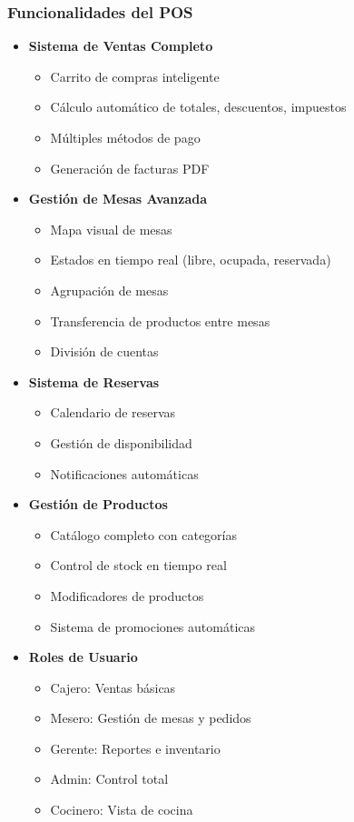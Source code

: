 \documentclass[12pt,a4paper]{article}
\begin{document}
\subsubsection{Funcionalidades del POS}
\begin{itemize}
    \item \textbf{Sistema de Ventas Completo}
    \begin{itemize}
        \item Carrito de compras inteligente
        \item Cálculo automático de totales, descuentos, impuestos
        \item Múltiples métodos de pago
        \item Generación de facturas PDF
    \end{itemize}
    
    \item \textbf{Gestión de Mesas Avanzada}
    \begin{itemize}
        \item Mapa visual de mesas
        \item Estados en tiempo real (libre, ocupada, reservada)
        \item Agrupación de mesas
        \item Transferencia de productos entre mesas
        \item División de cuentas
    \end{itemize}
    
    \item \textbf{Sistema de Reservas}
    \begin{itemize}
        \item Calendario de reservas
        \item Gestión de disponibilidad
        \item Notificaciones automáticas
    \end{itemize}
    
    \item \textbf{Gestión de Productos}
    \begin{itemize}
        \item Catálogo completo con categorías
        \item Control de stock en tiempo real
        \item Modificadores de productos
        \item Sistema de promociones automáticas
    \end{itemize}
    
    \item \textbf{Roles de Usuario}
    \begin{itemize}
        \item Cajero: Ventas básicas
        \item Mesero: Gestión de mesas y pedidos
        \item Gerente: Reportes e inventario
        \item Admin: Control total
        \item Cocinero: Vista de cocina
    \end{itemize}
\end{itemize}
\end{document}
